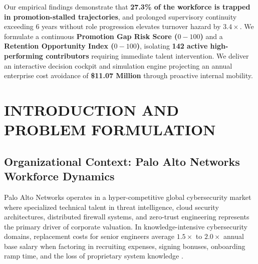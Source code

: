 \documentclass[12pt,a4paper,oneside]{report}
\begin{document}
Our empirical findings demonstrate that \textbf{27.3\% of the workforce is trapped in promotion-stalled trajectories}, and prolonged supervisory continuity exceeding $6$ years without role progression elevates turnover hazard by $3.4\times$. We formulate a continuous \textbf{Promotion Gap Risk Score ($0-100$)} and a \textbf{Retention Opportunity Index ($0-100$)}, isolating \textbf{142 active high-performing contributors} requiring immediate talent intervention. We deliver an interactive decision cockpit and simulation engine projecting an annual enterprise cost avoidance of \textbf{\$11.07 Million} through proactive internal mobility.

\clearpage
\setcounter{tocdepth}{1}
\tableofcontents

\clearpage
\listoftables

\clearpage
\listoffigures

\clearpage
{}
\setcounter{page}{1}

\clearpage
\chapter{INTRODUCTION AND PROBLEM FORMULATION}

\section{Organizational Context: Palo Alto Networks Workforce Dynamics}
Palo Alto Networks operates in a hyper-competitive global cybersecurity market where specialized technical talent in threat intelligence, cloud security architectures, distributed firewall systems, and zero-trust engineering represents the primary driver of corporate valuation. In knowledge-intensive cybersecurity domains, replacement costs for senior engineers average $1.5\times$ to $2.0\times$ annual base salary when factoring in recruiting expenses, signing bonuses, onboarding ramp time, and the loss of proprietary system knowledge \cite{ref_cascio_turnover, ref_allen_retention}.
\end{document}
